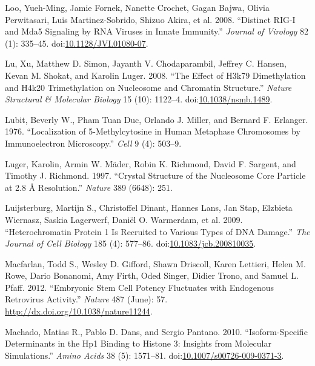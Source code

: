 \documentclass[onehalf,12pt]{beavtex}
\begin{document}
  \hypertarget{ref-LooDistinctRIGIMDA52008}{}
  Loo, Yueh-Ming, Jamie Fornek, Nanette Crochet, Gagan Bajwa, Olivia
  Perwitasari, Luis Martinez-Sobrido, Shizuo Akira, et al. 2008.
  ``Distinct RIG-I and Mda5 Signaling by RNA Viruses in Innate Immunity.''
  \emph{Journal of Virology} 82 (1): 335--45.
  doi:\href{https://doi.org/10.1128/JVI.01080-07}{10.1128/JVI.01080-07}.
  
  \hypertarget{ref-LueffectH3K79dimethylation2008}{}
  Lu, Xu, Matthew D. Simon, Jayanth V. Chodaparambil, Jeffrey C. Hansen,
  Kevan M. Shokat, and Karolin Luger. 2008. ``The Effect of H3k79
  Dimethylation and H4k20 Trimethylation on Nucleosome and Chromatin
  Structure.'' \emph{Nature Structural \& Molecular Biology} 15 (10):
  1122--4.
  doi:\href{https://doi.org/10.1038/nsmb.1489}{10.1038/nsmb.1489}.
  
  \hypertarget{ref-LubitLocalization5methylcytosinehuman1976}{}
  Lubit, Beverly W., Pham Tuan Duc, Orlando J. Miller, and Bernard F.
  Erlanger. 1976. ``Localization of 5-Methylcytosine in Human Metaphase
  Chromosomes by Immunoelectron Microscopy.'' \emph{Cell} 9 (4): 503--9.
  
  \hypertarget{ref-LugerCrystalstructurenucleosome1997}{}
  Luger, Karolin, Armin W. Mäder, Robin K. Richmond, David F. Sargent, and
  Timothy J. Richmond. 1997. ``Crystal Structure of the Nucleosome Core
  Particle at 2.8 Å Resolution.'' \emph{Nature} 389 (6648): 251.
  
  \hypertarget{ref-LuijsterburgHeterochromatinproteinrecruited2009a}{}
  Luijsterburg, Martijn S., Christoffel Dinant, Hannes Lans, Jan Stap,
  Elzbieta Wiernasz, Saskia Lagerwerf, Daniël O. Warmerdam, et al. 2009.
  ``Heterochromatin Protein 1 Is Recruited to Various Types of DNA
  Damage.'' \emph{The Journal of Cell Biology} 185 (4): 577--86.
  doi:\href{https://doi.org/10.1083/jcb.200810035}{10.1083/jcb.200810035}.
  
  \hypertarget{ref-MacfarlanEmbryonicstemcell2012}{}
  Macfarlan, Todd S., Wesley D. Gifford, Shawn Driscoll, Karen Lettieri,
  Helen M. Rowe, Dario Bonanomi, Amy Firth, Oded Singer, Didier Trono, and
  Samuel L. Pfaff. 2012. ``Embryonic Stem Cell Potency Fluctuates with
  Endogenous Retrovirus Activity.'' \emph{Nature} 487 (June): 57.
  \url{http://dx.doi.org/10.1038/nature11244}.
  
  \hypertarget{ref-MachadoIsoformspecificdeterminantsHP12010}{}
  Machado, Matias R., Pablo D. Dans, and Sergio Pantano. 2010.
  ``Isoform-Specific Determinants in the Hp1 Binding to Histone 3:
  Insights from Molecular Simulations.'' \emph{Amino Acids} 38 (5):
  1571--81.
  doi:\href{https://doi.org/10.1007/s00726-009-0371-3}{10.1007/s00726-009-0371-3}.
  
\end{document}
